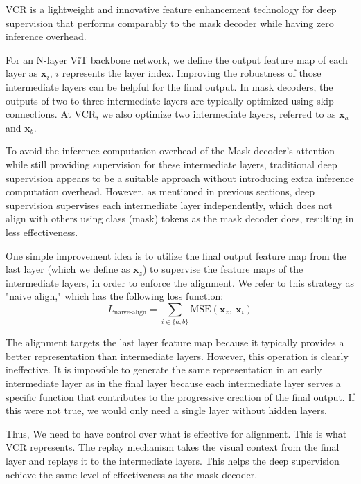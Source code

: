 VCR is a lightweight and innovative feature enhancement technology for deep supervision that performs comparably to the mask decoder while having zero inference overhead.

For an N-layer ViT backbone network, we define the output feature map of each layer as $\mathbf{x}_{i}$, $i$ represents the layer index.
%
Improving the robustness of those intermediate layers can be helpful for the final output.
%
In mask decoders, the outputs of two to three intermediate layers are typically optimized using skip connections. 
%
At VCR, we also optimize two intermediate layers, referred to as $\mathbf{x}_{a}$ and $\mathbf{x}_{b}$.

To avoid the inference computation overhead of the Mask decoder's attention while still providing supervision for these intermediate layers, traditional deep supervision appears to be a suitable approach without introducing extra inference computation overhead.
%
However, as mentioned in previous sections, deep supervision supervises each intermediate layer independently, which does not align with others using class (mask) tokens as the mask decoder does, resulting in less effectiveness.

One simple improvement idea is to utilize the final output feature map from the last layer (which we define as $\mathbf{x}_{z}$) to supervise the feature maps of the intermediate layers, in order to enforce the alignment.
%
%
We refer to this strategy as "naive align," which has the following loss function:
\begin{equation}
    L_{\text{naive-align}} = \sum_{i\in \{ a,b\}}\text{MSE}(\mathbf{x}_{z},~\mathbf{x}_{i})
\end{equation}


The alignment targets the last layer feature map because it typically provides a better representation than intermediate layers.
%
However, this operation is clearly ineffective. 
It is impossible to generate the same representation in an early intermediate layer as in the final layer because each intermediate layer serves a specific function that contributes to the progressive creation of the final output. 
If this were not true, we would only need a single layer without hidden layers.

Thus, We need to have control over what is effective for alignment.
%
This is what VCR represents. 
%
The replay mechanism takes the visual context from the final layer and replays it to the intermediate layers. 
%
This helps the deep supervision achieve the same level of effectiveness as the mask decoder.


